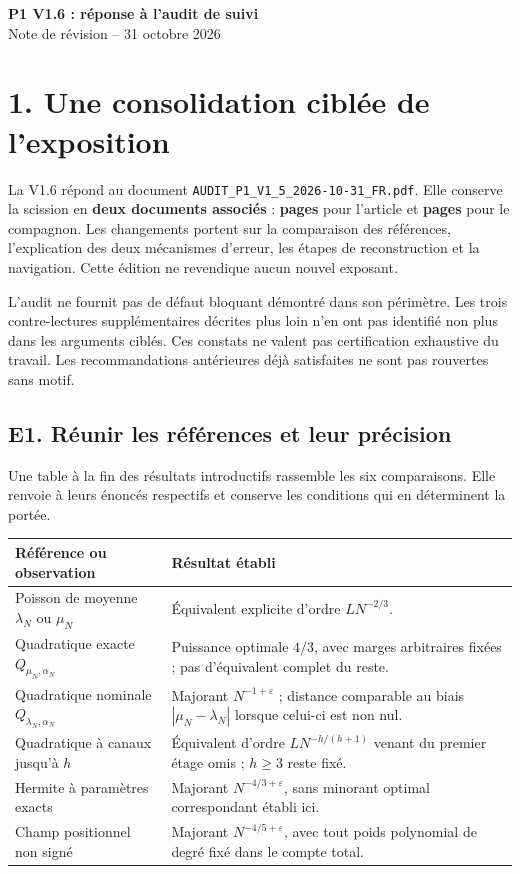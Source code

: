 \documentclass[11pt,a4paper]{article}
\newcommand{\eps}{\varepsilon}
\begin{document}
{\Large\bfseries\color{accent} P1 V1.6 : réponse à l'audit de suivi}\\[4pt]
{\large Note de révision -- 31 octobre 2026}

\section*{1. Une consolidation ciblée de l'exposition}
La V1.6 répond au document
\nolinkurl{AUDIT_P1_V1_5_2026-10-31_FR.pdf}.
Elle conserve la scission en \textbf{deux documents associés} :
\textbf{\MainPageCount{} pages} pour l'article et
\textbf{\CompanionPageCount{} pages} pour le compagnon.
Les changements portent sur la comparaison des références, l'explication
des deux mécanismes d'erreur, les étapes de reconstruction et la navigation.
Cette édition ne revendique aucun nouvel exposant.

L'audit ne fournit pas de défaut bloquant démontré dans son périmètre.
Les trois contre-lectures supplémentaires décrites plus loin n'en ont pas
identifié non plus dans les arguments ciblés. Ces constats ne valent pas
certification exhaustive du travail. Les recommandations antérieures
déjà satisfaites ne sont pas rouvertes sans motif.

\subsection*{E1. Réunir les références et leur précision}
Une table à la fin des résultats introductifs rassemble les six
comparaisons. Elle renvoie à leurs énoncés respectifs et conserve les
conditions qui en déterminent la portée.

\small
\begin{tabularx}{\textwidth}{@{}>{\raggedright\arraybackslash}p{}>{\raggedright\arraybackslash}X@{}}
\toprule
Référence ou observation & Résultat établi\\
\midrule
Poisson de moyenne \(\lambda_N\) ou \(\mu_N\)
& Équivalent explicite d'ordre \(LN^{-2/3}\).\\[5pt]
Quadratique exacte \(Q_{\mu_N,\alpha_N}\)
& Puissance optimale \(4/3\), avec marges arbitraires fixées ;
pas d'équivalent complet du reste.\\[5pt]
Quadratique nominale \(Q_{\lambda_N,\alpha_N}\)
& Majorant \(N^{-1+\eps}\) ; distance comparable au biais
\(|\mu_N-\lambda_N|\) lorsque celui-ci est non nul.\\[5pt]
Quadratique à canaux jusqu'à \(h\)
& Équivalent d'ordre \(LN^{-h/(h+1)}\) venant du premier
étage omis ; \(h\ge3\) reste fixé.\\[5pt]
Hermite à paramètres exacts
& Majorant \(N^{-4/3+\eps}\), sans minorant optimal
correspondant établi ici.\\[5pt]
Champ positionnel non signé
& Majorant \(N^{-4/5+\eps}\), avec tout poids polynomial
de degré fixé dans le compte total.\\
\bottomrule
\end{tabularx}
\normalsize
\end{document}
